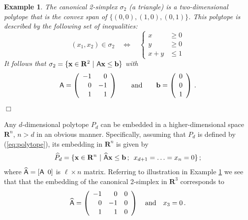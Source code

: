 \documentclass[pdf,12pt,relaxed]{SANDreport}
\newtheorem{exam}{Example}
\begin{document}
    \begin{exam}\label{ex:2simplex}
    \emph{
    The canonical 2-simplex $\sigma_2$ (a triangle) is a two-dimensional polytope that is the convex span of $\{(0,0), (1,0), (0,1)\}$.  This polytope is described by the following set of inequalities:
    $$
    (x_1,x_2) \in \sigma_2 \quad\Leftrightarrow\quad
    \left\{\begin{array}{rl} x & \ge 0 \\[0.25ex] y& \ge 0 \\[0.25ex] x+y & \le  1 \end{array}\right. 
    $$
    It follows that
    $
    \sigma_2 = \{{\bf x}\in {\bf R}^2 \,\,|\,\, {\sf A}{\bf x} \le {\bf b} \}
    $
    with
    $$
    {\sf A} = \left(\begin{array}{rr} -1&0 \\[0.25ex] 0& -1\\[0.25ex] 1& 1 \end{array}\right)
    \qquad\mbox{and}\qquad
    {\bf b} = \left(\begin{array}{c} 0\\[0.25ex] 0 \\[0.25ex] 1\end{array}\right) \,.
    $$
    }%
    \hfill$\Box$
    \end{exam}
    
       
     Any $d$-dimensional polytope $P_d$ can be embedded in a higher-dimensional space $\mathbf{R}^n$, $n>d$ in an obvious manner. Specifically, assuming that $P_d$ is defined by (\ref{eq:polytope}), its embedding in $\mathbf{R}^n$ is given by
    \begin{equation}\label{eq:polytope-ext}
    \widehat{P}_d = \{ {\bf x}\in{\mathbf R}^n\,\,|\,\, \widehat{\sf A}{\bf x} \le  {\bf b}\,;\,\,\,  x_{d+1} =\ldots=x_n = 0 \}\,;
    \end{equation}
    where $\widehat{\sf A} = \left[{\sf A} \,\,\, 0\right]$ is $\ell\times n$ matrix. Referring to illustration in Example \ref{ex:2simplex} we see that that the embedding of the canonical 2-simplex in $\mathbf{R}^3$ corresponds to 
    \begin{equation}\label{eq:exmat}
    \widehat{\sf A} = \left(\begin{array}{rrr} -1&0&0 \\[0.25ex] 0&-1&0\\[0.25ex] 1& 1&0 \end{array}\right)
    \quad\mbox{and}\quad x_3 = 0 \,.
    \end{equation}
    
\end{document}
